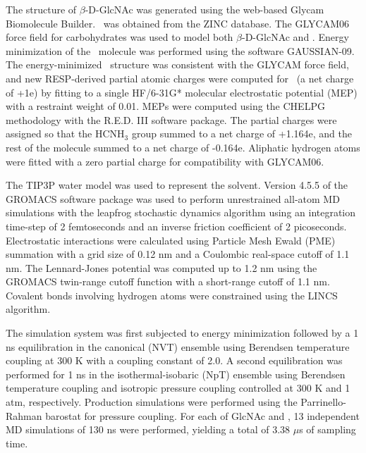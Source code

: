 The structure of $\beta$-D-GlcNAc was generated using the web-based Glycam Biomolecule Builder\cite{Woods:glycambuilder}. \glucosamine\ was obtained from the ZINC database.\cite{Irwin:2005kx} The GLYCAM06 force field for carbohydrates\cite{Kirschner:2008ii} was used to model both $\beta$-D-GlcNAc and \glucosamine. Energy minimization of the \glucosamine\ molecule was performed using the software GAUSSIAN-09.\cite{g09} The energy-minimized \glucosamine\ structure was consistent with the GLYCAM force field, and new RESP-derived partial atomic charges were computed for \glucosamine\ (a net charge of +1e) by fitting to a single HF/6-31G* molecular electrostatic potential (MEP) with a restraint weight of 0.01. MEPs were computed using the CHELPG methodology\cite{Breneman:1990ue} with the R.E.D. III software package.\cite{Dupradeau:2010bb} The partial charges were assigned so that the HCNH$_{3}$ group summed to a net charge of +1.164e, and the rest of the molecule summed to a net charge of -0.164e. Aliphatic hydrogen atoms were fitted with a zero partial charge for compatibility with GLYCAM06.

The TIP3P water model\cite{Jorgensen:1983p8768} was used to represent the solvent. Version 4.5.5 of the GROMACS software package \cite{Pronk:2013ef,Hess:2008p5353} was used to perform unrestrained all-atom MD simulations with the leapfrog stochastic dynamics algorithm using an integration time-step of 2 femtoseconds and an inverse friction coefficient of 2 picoseconds. Electrostatic interactions were calculated using Particle Mesh Ewald (PME) summation\cite{Darden:1993p8963} with a grid size of 0.12 nm and a Coulombic real-space cutoff of 1.1 nm. The Lennard-Jones potential was computed up to 1.2 nm using the GROMACS twin-range cutoff function with a short-range cutoff of 1.1 nm. Covalent bonds involving hydrogen atoms were constrained using the LINCS algorithm.\cite{Hess:1997p9065}

The simulation system was first subjected to energy minimization followed by a 1 ns equilibration in the canonical (NVT) ensemble using Berendsen temperature coupling\cite{Berendsen:1984p9257} at 300 K with a coupling constant of 2.0. A second equilibration was performed for 1 ns in the isothermal-isobaric (NpT) ensemble using Berendsen temperature coupling\cite{Berendsen:1984p9257} and isotropic pressure coupling\cite{Berendsen:1984p9257} controlled at 300 K and 1 atm, respectively. Production simulations were performed using the Parrinello-Rahman barostat for pressure coupling.\cite{Parrinello:1981vy} For each of GlcNAc and \glucosamine, 13 independent MD simulations of 130 ns were performed, yielding a total of 3.38 $\mu$s of sampling time. 

